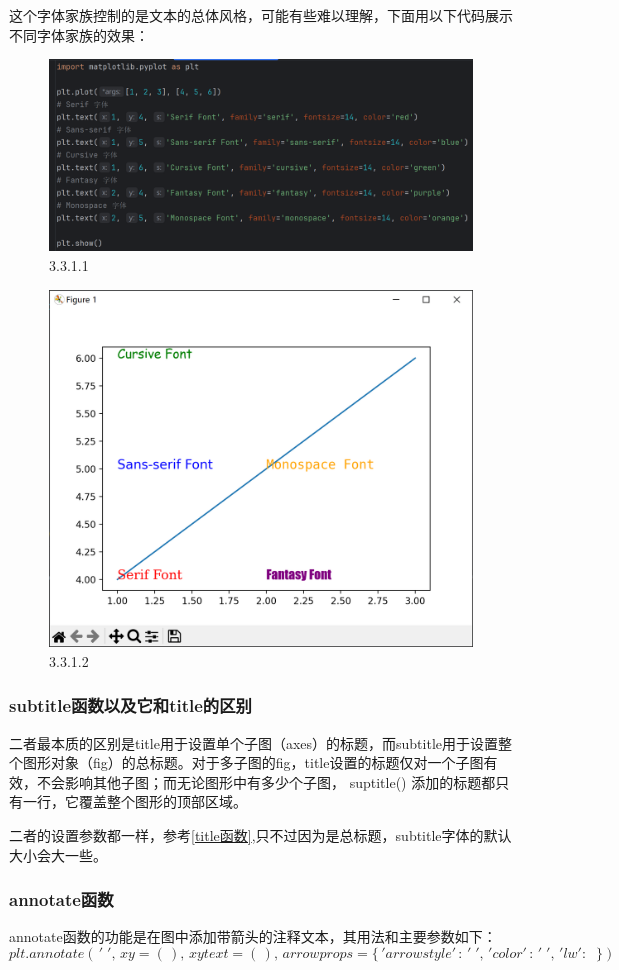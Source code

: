 \documentclass[12pt]{article}
\begin{document}
这个字体家族控制的是文本的总体风格，可能有些难以理解，下面用以下代码展示不同字体家族的效果：
\begin{figure}[H]
    \centering
    \includegraphics[width=0.75\linewidth]{字体家族 program.png}
    \caption{3.3.1.1}
    \label{fig:enter-label}
\end{figure}

\begin{figure}[H]
    \centering
    \includegraphics[width=0.65\linewidth]{字体家族 Pic.png}
    \caption{3.3.1.2}
    \label{fig:enter-label}
\end{figure}

\subsubsection{subtitle函数以及它和title的区别}\label{subtitle函数以及它和title的区别}
二者最本质的区别是title用于设置单个子图（axes）的标题，而subtitle用于设置整个图形对象（fig）的总标题。对于多子图的fig，title设置的标题仅对一个子图有效，不会影响其他子图；而无论图形中有多少个子图，  suptitle()   添加的标题都只有一行，它覆盖整个图形的顶部区域。

二者的设置参数都一样，参考\ref{title函数},只不过因为是总标题，subtitle字体的默认大小会大一些。

\subsubsection{annotate函数}
annotate函数的功能是在图中添加带箭头的注释文本，其用法和主要参数如下：
\[plt.annotate(\,'\;',\,xy=(\,),\,xytext=(\,),\,arrowprops=\{\,'arrowstyle'\,:\, '\;',\, 'color'\,:\, '\;',\,'lw':\;\;\})\]
\end{document}
